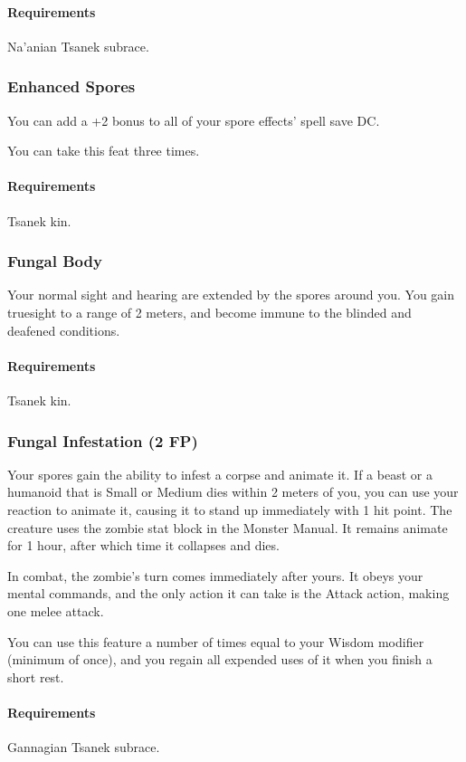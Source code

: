        \paragraph{Requirements} Na'anian Tsanek subrace.
    \subsubsection{Enhanced Spores} \label{feat::enhancedspores}
        You can add a +2 bonus to all of your spore effects' spell save DC.

        You can take this feat three times.
        \paragraph{Requirements} Tsanek kin.
    \subsubsection{Fungal Body} \label{feat::fungalbody}
        Your normal sight and hearing are extended by the spores around you.
        You gain truesight to a range of 2 meters, and become immune to the blinded and deafened conditions.
        \paragraph{Requirements} Tsanek kin.
    \subsubsection{Fungal Infestation (2 FP)} \label{feat::fungalinfestation}
        Your spores gain the ability to infest a corpse and animate it.
        If a beast or a humanoid that is Small or Medium dies within 2 meters of you, you can use your reaction to animate it, causing it to stand up immediately with 1 hit point.
        The creature uses the zombie stat block in the Monster Manual.
        It remains animate for 1 hour, after which time it collapses and dies.

        In combat, the zombie's turn comes immediately after yours.
        It obeys your mental commands, and the only action it can take is the Attack action, making one melee attack.

        You can use this feature a number of times equal to your Wisdom modifier (minimum of once), and you regain all expended uses of it when you finish a short rest.
        \paragraph{Requirements} Gannagian Tsanek subrace.
